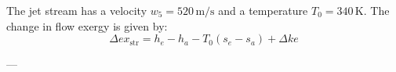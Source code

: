 The jet stream has a velocity \( w_5 = 520 \, \text{m/s} \) and a temperature \( T_0 = 340 \, \text{K} \).  
The change in flow exergy is given by:  
\[
\Delta ex_{\text{str}} = h_e - h_a - T_0 (s_e - s_a) + \Delta ke
\]

---